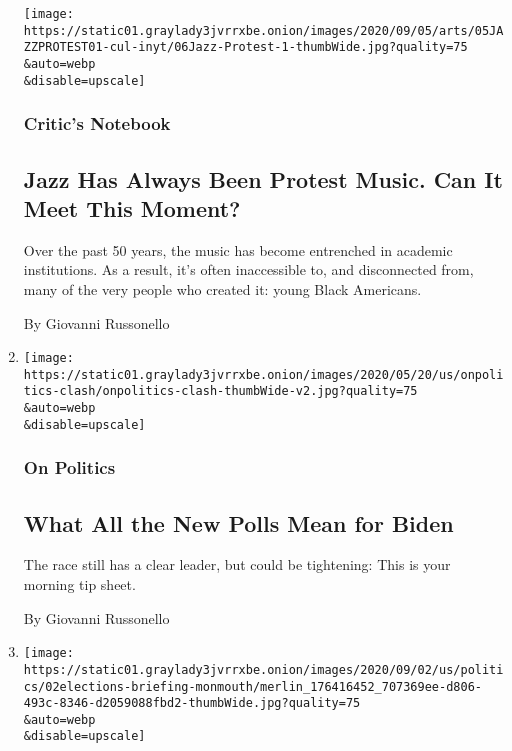 \begin{enumerate}
  \texttt{[image: https://static01.graylady3jvrrxbe.onion/images/2020/09/05/arts/05JAZZPROTEST01-cul-inyt/06Jazz-Protest-1-thumbWide.jpg?quality=75\\\&auto=webp\\\&disable=upscale]}

  \hypertarget{critics-notebook}{%
  \subsubsection{Critic's Notebook}\label{critics-notebook}}

  \hypertarget{jazz-has-always-been-protest-music-can-it-meet-this-moment}{%
  \subsection{Jazz Has Always Been Protest Music. Can It Meet This
  Moment?}\label{jazz-has-always-been-protest-music-can-it-meet-this-moment}}

  Over the past 50 years, the music has become entrenched in academic
  institutions. As a result, it's often inaccessible to, and
  disconnected from, many of the very people who created it: young Black
  Americans.

  By Giovanni Russonello
\item
  \href{/2020/09/03/us/politics/biden-trump-polling.html}{}

  \texttt{[image: https://static01.graylady3jvrrxbe.onion/images/2020/05/20/us/onpolitics-clash/onpolitics-clash-thumbWide-v2.jpg?quality=75\\\&auto=webp\\\&disable=upscale]}

  \hypertarget{on-politics-2}{%
  \subsubsection{On Politics}\label{on-politics-2}}

  \hypertarget{what-all-the-new-polls-mean-for-biden}{%
  \subsection{What All the New Polls Mean for
  Biden}\label{what-all-the-new-polls-mean-for-biden}}

  The race still has a clear leader, but could be tightening: This is
  your morning tip sheet.

  By Giovanni Russonello
\item
  \href{/live/2020/09/02/us/trump-vs-biden/post-convention-polls-show-bidens-national-lead-tightening}{}

  \texttt{[image: https://static01.graylady3jvrrxbe.onion/images/2020/09/02/us/politics/02elections-briefing-monmouth/merlin\_176416452\_707369ee-d806-493c-8346-d2059088fbd2-thumbWide.jpg?quality=75\\\&auto=webp\\\&disable=upscale]}


\end{enumerate}
